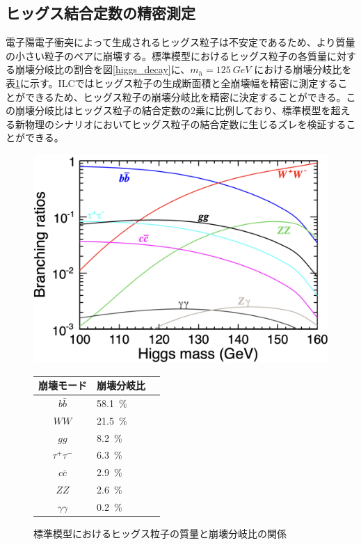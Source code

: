 \subsection{ヒッグス結合定数の精密測定}
電子陽電子衝突によって生成されるヒッグス粒子は不安定であるため、より質量の小さい粒子のペアに崩壊する。標準模型におけるヒッグス粒子の各質量に対する崩壊分岐比の割合を図\ref{higgs_decay}に、$m_h = \SI{125}{GeV}$ における崩壊分岐比を表\ref{HiggsDecayonILC}に示す。ILCではヒッグス粒子の生成断面積と全崩壊幅を精密に測定することができるため、ヒッグス粒子の崩壊分岐比を精密に決定することができる。この崩壊分岐比はヒッグス粒子の結合定数の2乗に比例しており、標準模型を超える新物理のシナリオにおいてヒッグス粒子の結合定数に生じるズレを検証することができる。
\begin{figure}[H]
 \begin{minipage}[h]{.45\linewidth}
	\begin{center}
 \includegraphics[keepaspectratio, scale=0.2]
 	{Figure/Introduction/higgs_decay.png}
 	\caption{標準模型におけるヒッグス粒子の質量と崩壊分岐比の関係}
 	\label{higgs_decay}
	\end{center}
 \end{minipage}
 \hfill
\begin{minipage}[ht]{.45\linewidth}
 \centering
  \begin{tabular}{clc}
   \hline
   崩壊モード & 崩壊分岐比\\
   \hline \hline
   $b\bar{b}$ & 58.1\, \%\\
   $WW$ & 21.5\, \%\\
   $gg$ & 8.2\, \%\\
   ${\tau}^+ {\tau}^-$ & 6.3\, \%\\
   $c \bar{c}$ & 2.9\, \%\\
   $ZZ$ & 2.6\, \%\\
   $\gamma \gamma$ & 0.2\, \%\\
   \hline
  \end{tabular}
  \label{HiggsDecayonILC}
 \end{minipage}
 \end{figure}

